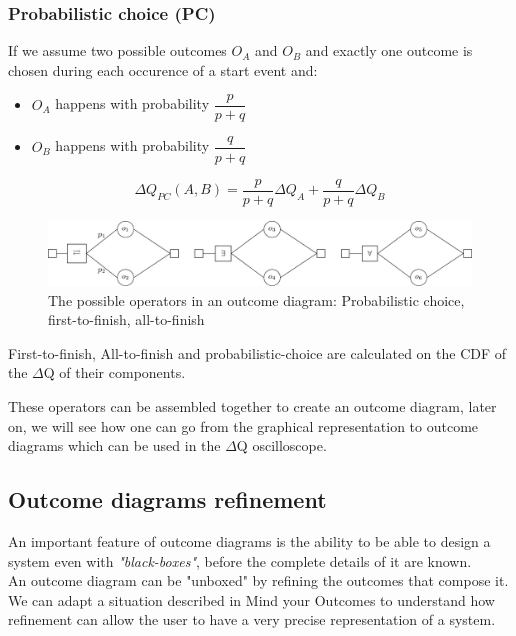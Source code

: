     \subsubsection{Probabilistic choice (PC)}
        If we assume two possible outcomes $O_A$ and $O_B$ and exactly one outcome is chosen during each occurence of a start event and:
        \begin{itemize}
            \item $O_A$ happens with probability $\dfrac{p}{p+q}$
            \item $O_B$ happens with probability $\dfrac{q}{p + q}$
        \end{itemize}
        \begin{equation}
           \Delta Q_{PC}(A, B) = \dfrac{p}{p + q}\Delta Q_A + \dfrac{q}{p + q}\Delta Q_B 
            \label{eq:pc}
        \end{equation} 

    \begin{figure}[H]
        \begin{center}
            \includegraphics[width = \textwidth]{tikz/op.pdf}
        \end{center}
        \caption{The possible operators in an outcome diagram: Probabilistic choice, first-to-finish, all-to-finish}
        \label{fig:op}
    \end{figure}
    First-to-finish, All-to-finish and probabilistic-choice are calculated on the CDF of the $\Delta$Q of their components.
    
    These operators can be assembled together to create an outcome diagram, later on, we will see how one can go from the graphical representation to outcome diagrams which can be used in the $\Delta$Q oscilloscope.
    
    \subsection{Outcome diagrams refinement}
        An important feature of outcome diagrams is the ability to be able to design a system even with \textit{"black-boxes"}, before the complete details of it are known. \\
        An outcome diagram can be "unboxed" by refining the outcomes that compose it. We can adapt a situation described in Mind your Outcomes to understand how refinement can allow the user to have a very precise representation of a system. \cite{myo}
        
